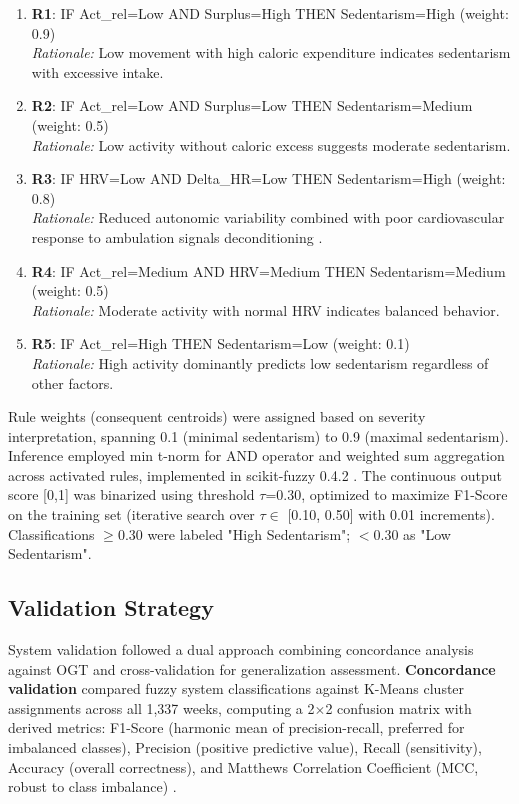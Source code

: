 \begin{enumerate}
\item \textbf{R1}: IF Act\_rel=Low AND Surplus=High THEN Sedentarism=High (weight: 0.9) \\ \textit{Rationale:} Low movement with high caloric expenditure indicates sedentarism with excessive intake.

\item \textbf{R2}: IF Act\_rel=Low AND Surplus=Low THEN Sedentarism=Medium (weight: 0.5) \\ \textit{Rationale:} Low activity without caloric excess suggests moderate sedentarism.

\item \textbf{R3}: IF HRV=Low AND Delta\_HR=Low THEN Sedentarism=High (weight: 0.8) \\ \textit{Rationale:} Reduced autonomic variability combined with poor cardiovascular response to ambulation signals deconditioning \cite{Thayer2009,Shaffer2017}.

\item \textbf{R4}: IF Act\_rel=Medium AND HRV=Medium THEN Sedentarism=Medium (weight: 0.5) \\ \textit{Rationale:} Moderate activity with normal HRV indicates balanced behavior.

\item \textbf{R5}: IF Act\_rel=High THEN Sedentarism=Low (weight: 0.1) \\ \textit{Rationale:} High activity dominantly predicts low sedentarism regardless of other factors.
\end{enumerate}

Rule weights (consequent centroids) were assigned based on severity interpretation, spanning 0.1 (minimal sedentarism) to 0.9 (maximal sedentarism). Inference employed min t-norm for AND operator and weighted sum aggregation across activated rules, implemented in scikit-fuzzy 0.4.2 \cite{Zadeh1965}. The continuous output score [0,1] was binarized using threshold $\tau$=0.30, optimized to maximize F1-Score on the training set (iterative search over $\tau \in$ [0.10, 0.50] with 0.01 increments). Classifications $\geq$0.30 were labeled "High Sedentarism"; $<$0.30 as "Low Sedentarism".

\subsection{Validation Strategy}
\label{subsec:validation}

System validation followed a dual approach combining concordance analysis against OGT and cross-validation for generalization assessment. \textbf{Concordance validation} compared fuzzy system classifications against K-Means cluster assignments across all 1,337 weeks, computing a 2$\times$2 confusion matrix with derived metrics: F1-Score (harmonic mean of precision-recall, preferred for imbalanced classes), Precision (positive predictive value), Recall (sensitivity), Accuracy (overall correctness), and Matthews Correlation Coefficient (MCC, robust to class imbalance) \cite{Chicco2020,Powers2020}.


